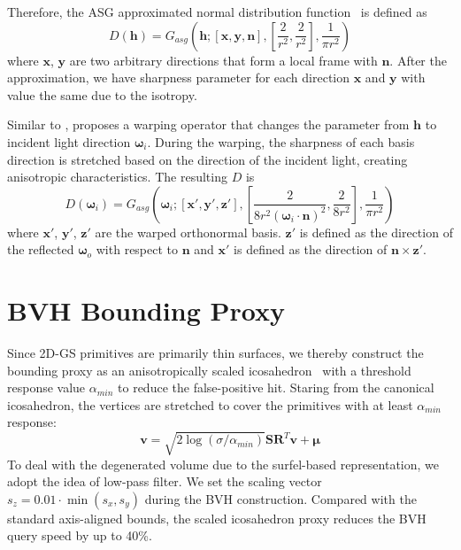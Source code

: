 Therefore, the ASG approximated normal distribution function~\cite{xu2013anisotropic} is defined as 
\begin{equation}
    D(\boldsymbol{h}) = G_{asg}(\boldsymbol{h}; [\mathbf{x}, \mathbf{y}, \boldsymbol{n}], [\frac{2}{r^2},\frac{2}{r^2}], \frac{1}{\pi r^2})
\end{equation}
where $\mathbf{x}$, $\mathbf{y}$ are two arbitrary directions that form a local frame with $\boldsymbol{n}$. After the approximation, we have sharpness parameter for each direction $\mathbf{x}$ and $\mathbf{y}$ with value the same due to the isotropy. 

Similar to \cite{wang2009all}, \cite{xu2013anisotropic} proposes a warping operator that changes the parameter from $\boldsymbol{h}$ to incident light direction $\boldsymbol{\omega}_i$. During the warping, the sharpness of each basis direction is stretched based on the direction of the incident light, creating anisotropic characteristics. The resulting $\textit{D}$ is 
\begin{equation}
    D(\boldsymbol{\omega}_i) = G_{asg}(\boldsymbol{\omega}_i; [\mathbf{x'}, \mathbf{y'}, \mathbf{z'}], [\frac{2}{8r^2(\boldsymbol{\omega}_i \cdot \boldsymbol{n})^2},\frac{2}{8r^2}], \frac{1}{\pi r^2})
\end{equation}
where $\mathbf{x'}$, $\mathbf{y'}$, $\mathbf{z'}$ are the warped orthonormal basis. $\mathbf{z'}$ is defined as the direction of the reflected $\boldsymbol{\omega}_o$ with respect to $\boldsymbol{n}$ and $\mathbf{x'}$ is defined as the direction of $\boldsymbol{n} \times \mathbf{z'}$. 

\section{BVH Bounding Proxy}
Since 2D-GS primitives are primarily thin surfaces, we thereby construct the bounding proxy as an anisotropically scaled icosahedron~\cite{moenne20243d} with a threshold response value $\alpha_{min}$ to reduce the false-positive hit. Staring from the canonical icosahedron, the vertices are stretched to cover the primitives with at least $\alpha_{min}$ response: 
\begin{equation}
  \label{eq:primitive_transform}
  \mathbf{v} = \sqrt{2 \log(\sigma / \alpha_{min})} 
                \mathbf{S} \mathbf{R}^{T} \mathbf{v} + \mathbf{\mu}
\end{equation}
To deal with the degenerated volume due to the surfel-based representation, we adopt the idea of low-pass filter. We set the scaling vector $s_z = 0.01 \cdot \min(s_x, s_y)$ during the BVH construction. Compared with the standard axis-aligned bounds, the scaled icosahedron proxy reduces the BVH query speed by up to 40\%. 

